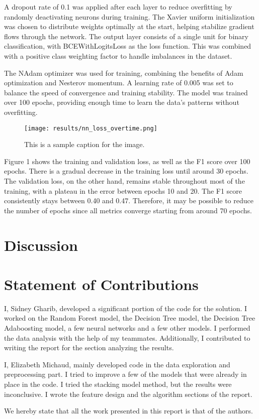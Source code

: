 \documentclass{article} %
\begin{document}
A dropout rate of 0.1 was applied after each layer to reduce overfitting by randomly deactivating neurons during training. The Xavier uniform initialization was chosen to distribute weights optimally at the start, helping stabilize gradient flows through the network. The output layer consists of a single unit for binary classification, with BCEWithLogitsLoss as the loss function. This was combined with a positive class weighting factor to handle imbalances in the dataset.

The NAdam optimizer was used for training, combining the benefits of Adam optimization and Nesterov momentum. A learning rate of 0.005 was set to balance the speed of convergence and training stability. The model was trained over 100 epochs, providing enough time to learn the data's patterns without overfitting.


\begin{figure}[ht!]
   \centering
   \texttt{[image: results/nn\_loss\_overtime.png]}
   \caption{This is a sample caption for the image.}
   \label{fig:sample-image}
\end{figure}

Figure 1 shows the training and validation loss, as well as the F1 score over 100 epochs. There is a gradual decrease in the training loss until around 30 epochs. The validation loss, on the other hand, remains stable throughout most of the training, with a plateau in the error between epochs 10 and 20. The F1 score consistently stays between 0.40 and 0.47. Therefore, it may be possible to reduce the number of epochs since all metrics converge starting from around 70 epochs.


\section{Discussion}

\section{Statement of Contributions}
\label{others}

I, Sidney Gharib, developed a significant portion of the code for the solution.
I worked on the Random Forest model, the Decision Tree model, the Decision Tree Adaboosting model, a few neural networks and a few other models.
I performed the data analysis with the help of my teammates. Additionally, I contributed to writing the report for the section analyzing the results.

I, Elizabeth Michaud, mainly developed code in the data exploration and preprocessing part. I tried to improve a few of the models that were already 
in place in the code. I tried the stacking model method, but the results were inconclusive. I wrote the feature design and the algorithm sections of 
the report. 

We hereby state that all the work presented in this report is that of the authors.
\end{document}
